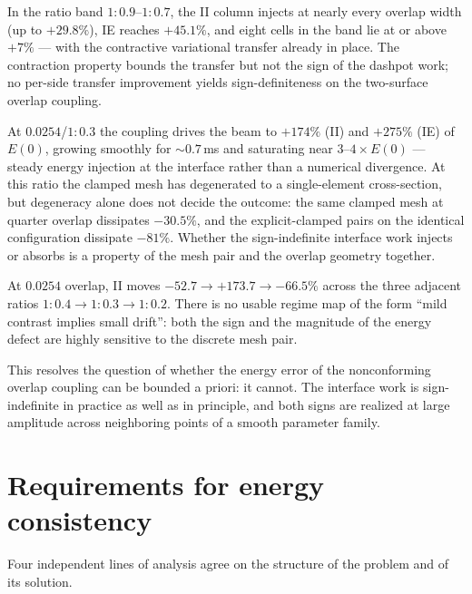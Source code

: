 \documentclass[11pt]{article}
\begin{document}
\begin{description}[style=unboxed,leftmargin=0pt,itemsep=2pt]
  \item[Injection at mild coarsening is systematic, not exceptional.] In
  the ratio band $1{:}0.9$--$1{:}0.7$, the II column injects at nearly
  every overlap width (up to $+29.8\%$), IE reaches $+45.1\%$, and eight
  cells in the band lie at or above $+7\%$ --- with the contractive
  variational transfer already in place. The contraction property bounds
  the transfer but not the sign of the dashpot work; no per-side transfer
  improvement yields sign-definiteness on the two-surface overlap
  coupling.
  \item[A strong injection case.] At $0.0254$/$1{:}0.3$ the coupling drives
  the beam to $+174\%$ (II) and $+275\%$ (IE) of $E(0)$, growing smoothly
  for ${\sim}0.7$\,ms and saturating near $3$--$4\times E(0)$ --- steady
  energy injection at the interface rather than a numerical divergence. At
  this ratio the clamped mesh has degenerated to a single-element
  cross-section, but degeneracy alone does not decide the outcome: the same
  clamped mesh at quarter overlap dissipates $-30.5\%$, and the
  explicit-clamped pairs on the identical configuration dissipate $-81\%$.
  Whether the sign-indefinite interface work injects or absorbs is a
  property of the mesh pair and the overlap geometry together.
  \item[The drift is strongly non-monotone in the ratio.] At $0.0254$
  overlap, II moves $-52.7 \to +173.7 \to -66.5\%$ across the three adjacent
  ratios $1{:}0.4 \to 1{:}0.3 \to 1{:}0.2$. There is no usable regime map of
  the form ``mild contrast implies small drift'': both the sign and the
  magnitude of the energy defect are highly sensitive to the discrete
  mesh pair.
\end{description}

This resolves the question of whether the energy error of the nonconforming
overlap coupling can be bounded a priori: it cannot. The interface work is
sign-indefinite in practice as well as in principle, and both signs are
realized at large amplitude across neighboring points of a smooth parameter
family.

\section{Requirements for energy consistency}
\label{sec:theory}

Four independent lines of analysis agree on the structure of the problem
and of its solution.
\end{document}
